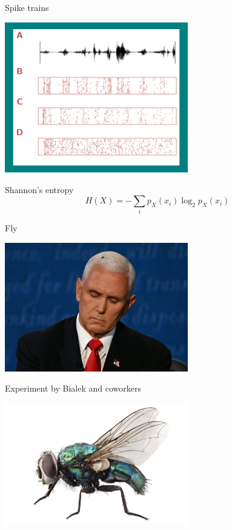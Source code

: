 \documentclass{beamer}
\begin{document}
\begin{frame}{Spike trains}
\color{reddish}
\begin{center}
\includegraphics[width=8cm]{SpikeTrains.png}
\end{center}
\end{frame}

\begin{frame}{Shannon's entropy}
\color{reddish}
$$
H(X)=-\sum_i p_X(x_i)\log_2{p_X(x_i)}
$$
\color{black}
\end{frame}

\begin{frame}{Fly}
  \begin{center}
    \includegraphics[width=8cm]{pence_fly.jpg}
  \end{center}
\end{frame}

\begin{frame}{Experiment by Bialek and coworkers}
  \begin{center}
    \includegraphics[width=8cm]{Blow-Fly.jpg}
  \end{center}
\end{frame}
  
\end{document}
